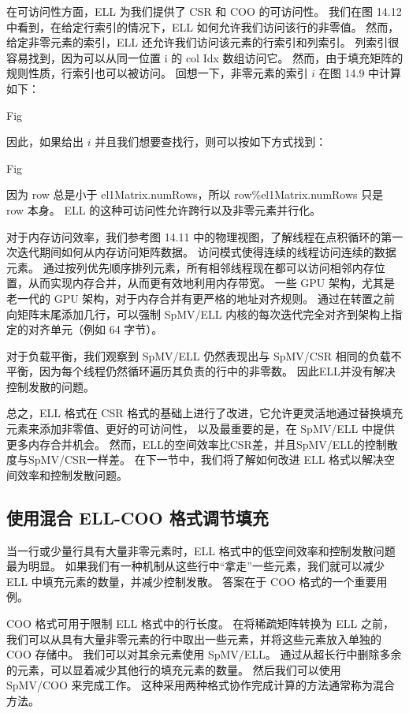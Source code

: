 在可访问性方面，ELL 为我们提供了 CSR 和 COO 的可访问性。 
我们在图 14.12 中看到，在给定行索引的情况下，ELL 如何允许我们访问该行的非零值。 
然而，给定非零元素的索引，ELL 还允许我们访问该元素的行索引和列索引。 
列索引很容易找到，因为可以从同一位置 i 的 col Idx 数组访问它。 
然而，由于填充矩阵的规则性质，行索引也可以被访问。 回想一下，非零元素的索引 $i$ 在图 14.9 中计算如下：

{\color{red} Fig}

因此，如果给出 $i$ 并且我们想要查找行，则可以按如下方式找到：

{\color{red} Fig}

因为 row 总是小于 el1Matrix.numRows，所以 row\%el1Matrix.numRows 只是 row 本身。 
ELL 的这种可访问性允许跨行以及非零元素并行化。

对于内存访问效率，我们参考图 14.11 中的物理视图，了解线程在点积循环的第一次迭代期间如何从内存访问矩阵数据。 
访问模式使得连续的线程访问连续的数据元素。 
通过按列优先顺序排列元素，所有相邻线程现在都可以访问相邻内存位置，从而实现内存合并，从而更有效地利用内存带宽。 
一些 GPU 架构，尤其是老一代的 GPU 架构，对于内存合并有更严格的地址对齐规则。 
通过在转置之前向矩阵末尾添加几行，可以强制 SpMV/ELL 内核的每次迭代完全对齐到架构上指定的对齐单元（例如 64 字节）。

对于负载平衡，我们观察到 SpMV/ELL 仍然表现出与 SpMV/CSR 相同的负载不平衡，因为每个线程仍然循环遍历其负责的行中的非零数。 
因此ELL并没有解决控制发散的问题。

总之，ELL 格式在 CSR 格式的基础上进行了改进，它允许更灵活地通过替换填充元素来添加非零值、更好的可访问性，
以及最重要的是，在 SpMV/ELL 中提供更多内存合并机会。 
然而，ELL的空间效率比CSR差，并且SpMV/ELL的控制散度与SpMV/CSR一样差。 
在下一节中，我们将了解如何改进 ELL 格式以解决空间效率和控制发散问题。

\subsection{使用混合 ELL-COO 格式调节填充}
当一行或少量行具有大量非零元素时，ELL 格式中的低空间效率和控制发散问题最为明显。 
如果我们有一种机制从这些行中“拿走”一些元素，我们就可以减少 ELL 中填充元素的数量，并减少控制发散。 
答案在于 $\mathrm{COO}$ 格式的一个重要用例。

COO 格式可用于限制 ELL 格式中的行长度。 
在将稀疏矩阵转换为 ELL 之前，我们可以从具有大量非零元素的行中取出一些元素，并将这些元素放入单独的 COO 存储中。 
我们可以对其余元素使用 SpMV/ELL。 通过从超长行中删除多余的元素，可以显着减少其他行的填充元素的数量。 
然后我们可以使用 SpMV/COO 来完成工作。 这种采用两种格式协作完成计算的方法通常称为混合方法。

